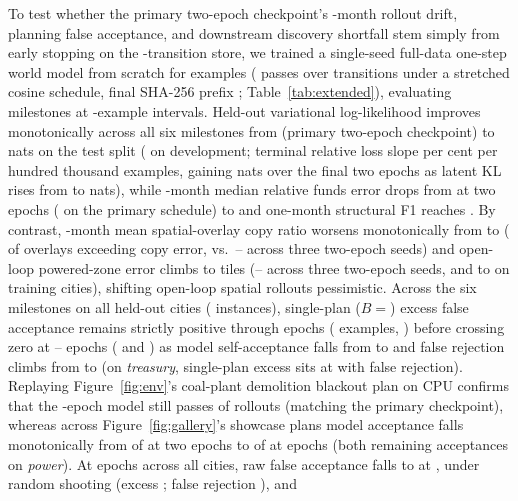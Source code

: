 To test whether the primary two-epoch checkpoint's \Horizon-month rollout drift, planning false acceptance, and downstream discovery shortfall stem simply from early stopping on the \TrainTransitions-transition store, we trained a single-seed \SizeM{} full-data one-step world model from scratch for \ExtTrSamples{} examples (\ExtTrEpochs{} passes over \TrainTransitions{} transitions under a stretched cosine schedule, final SHA-256 prefix \texttt{\ExtTrSha}; Table~\ref{tab:extended}), evaluating milestones at \HpSamplesOs{}-example intervals. Held-out variational log-likelihood improves monotonically across all six milestones from \ExtTrBaseTestElbo{} (primary two-epoch checkpoint) to \ExtTrTestElbo{} nats on the test split (\ExtTrDevElbo{} on development; terminal relative loss slope \ExtTrLossSlopePct{} per cent per hundred thousand examples, gaining \ExtTrLastTwoElboGain{} nats over the final two epochs as latent KL rises from \ExtTrKlStart{} to \ExtTrKlEnd{} nats), while \RollA-month median relative funds error drops from \ExtTrFirstFunds{} at two epochs (\TestMainFunds{} on the primary schedule) to \ExtTrTestFunds{} and one-month structural F1 reaches \ExtTrTestFOne{} \ci{\ExtTrTestFOneCI}. By contrast, \Horizon-month mean spatial-overlay copy ratio worsens monotonically from \ExtTrFirstMeanOv{} to \ExtTrMeanOv{} (\ExtTrGeCopy{} of \HorOverlays{} overlays exceeding copy error, vs.\ \ExtTrSeedGeMin{}--\ExtTrSeedGeMax{} across three two-epoch seeds) and open-loop powered-zone error climbs to \ExtTrPowMae{} tiles (\ExtTrSeedPowMin{}--\ExtTrSeedPowMax{} across three two-epoch seeds, and \ExtTrTrainPowBase{} to \ExtTrTrainPow{} on training cities), shifting open-loop spatial rollouts pessimistic. Across the six milestones on all \AllCities{} held-out cities (\AllInstances{} instances), single-plan ($B ={}$) excess false acceptance remains strictly positive through \ExtTrMileEightEpochs{} epochs (\ExtTrMileEightSamples{} examples, \ExtTrMileEightExcess{} \ci{\ExtTrMileEightExcessCI}) before crossing zero at \ExtTrMileTenEpochs{}--\ExtTrEpochs{} epochs (\ExtTrMileTenExcess{} \ci{\ExtTrMileTenExcessCI} and \ExtTrRandOneAllExcess{} \ci{\ExtTrRandOneAllExcessCI}) as model self-acceptance falls from \ExtTrMileTwoJudgeAcc{} to \ExtTrRandOneAllJudgeAcc{} and false rejection climbs from \ExtTrMileTwoFalseRej{} to \ExtTrRandOneAllFalseRej{} (on \emph{treasury}, single-plan excess sits at \ExtTrRandOneAllTreasExcess{} \ci{\ExtTrRandOneAllTreasExcessCI} with \ExtTrRandOneAllTreasFalseRej{} false rejection). Replaying Figure~\ref{fig:env}'s coal-plant demolition blackout plan on CPU confirms that the \ExtTrEpochs-epoch model still passes \ExtTrFigOnePass{} of \FigOneK{} rollouts (matching the primary checkpoint), whereas across Figure~\ref{fig:gallery}'s \GalPairs{} showcase plans model acceptance falls monotonically from \ExtTrGalStartAcc{} of \GalPairs{} at two epochs to \ExtTrGalEndAcc{} of \GalPairs{} at \ExtTrEpochs{} epochs (both remaining acceptances on \emph{power}). At \ExtTrEpochs{} epochs across all \AllCities{} cities, raw false acceptance falls to \ExtTrRandOneAllHack{} at , \ExtTrRandThouAllHack{} under  random shooting (excess \ExtTrRandThouAllExcess{} \ci{\ExtTrRandThouAllExcessCI}; false rejection \ExtTrRandThouAllFalseRej{}), and \ExtTrAdThouAllHack{} 